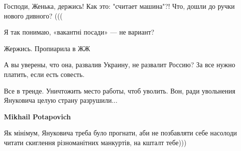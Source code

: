 \begin{itemize}
 
Господи, Женька, держись!
Как это: "считает машина"?! Что, дошли до ручки нового дивного? (((

 
Я так понимаю, «вакантні посади» — не вариант?

 
Жержись. Пропиарила в ЖЖ

 
А вы уверены, что она, развалив Украину, не развалит Россию? За все нужно платить, если есть совесть.

 
Все в тренде. Уничтожить место работы, чтоб уволить.
Вон, ради увольнения Януковича целую страну разрушили...


\begin{itemize}
 
\textbf{Mikhail Potapovich} 

Як мінімум, Януковича треба було прогнати, аби не позбавляти себе насолоди
читати скиглення різноманітних манкуртів, на кшталт тебе)))


 

\end{itemize}
\end{itemize}
